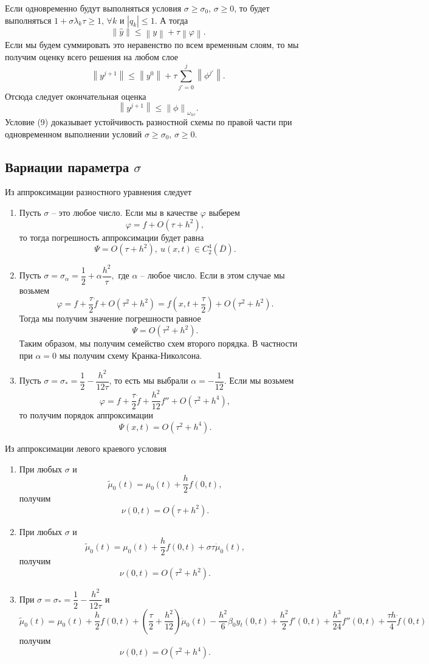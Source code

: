 \documentclass[a4paper, 12pt]{article}
\newcommand\Norm[1]{\left\| #1 \right\|}
\begin{document}
    Если одновременно будут выполняться условия $\sigma \geq \sigma_0$, $\sigma \geq 0$, то будет выполняться $1+\sigma \lambda_k \tau \geq 1$, $\forall k$ и $|q_k|\leq 1$. А тогда 
    $$\Norm {\hat{{ y}}}\leq\Norm{{ y}} + \tau \Norm{\varphi}.$$
    Если мы будем суммировать это неравенство по всем временным слоям, то мы получим оценку всего решения на любом слое 
    $$\Norm{{ {y}}^{j+1}} \leq \Norm{y^0} + \tau \sum_{j'= 0}^j \Norm{\phi^{j'}}.$$
    Отсюда следует окончательная оценка
    \begin{equation}
    	\Norm{{ {y}}^{j+1}}\leq \Norm{\phi}_{\omega _{h\tau}}.
    \end{equation}
    Условие (9) доказывает устойчивость разностной схемы по правой части при одновременном выполнении условий $\sigma \geq \sigma_0$, $\sigma \geq 0$.
    \subsection*{Вариации параметра $\sigma$}
    Из аппроксимации разностного уравнения следует
    \begin{enumerate}
    	\item Пусть $\sigma$ -- это любое число. Если мы в качестве $\varphi$ выберем
    	$$\varphi = f + O(\tau + h^2),$$ то тогда погрешность аппроксимации будет равна
    	$$\Psi = O(\tau + h^2),\ u(x,t) \in C_2^4 (\overline D).$$
    	\item Пусть $\sigma = \sigma_\alpha = \dfrac 12 + \alpha \dfrac{h^2}{\tau},$ где $\alpha$ -- любое число. Если в этом случае мы возьмем
    	$$\varphi = f + \dfrac \tau 2 \dot f + O(\tau^2 + h^2) = f\left(x,t + \dfrac \tau 2\right) + O(\tau^2 + h^2).$$ Тогда мы получим значение погрешности равное
    	$$\Psi = O(\tau^2 + h^2).$$
    	Таким образом, мы получим семейство схем второго порядка. В частности при $\alpha = 0$ мы получим схему Кранка-Николсона.
    	\item Пусть $\sigma = \sigma_* = \dfrac 12 - \dfrac {h^2}{12\tau}$, то есть мы выбрали $\alpha = - \dfrac {1}{12}$. Если мы возьмем
    	$$\varphi = f + \dfrac \tau 2 \dot f + \dfrac{h^2}{12}f'' + O(\tau^2 + h^4),$$
    	то получим порядок аппроксимации
    	$$\Psi(x,t) = O(\tau^2 + h^4).$$
    \end{enumerate}
    Из аппроксимации левого краевого условия
    \begin{enumerate}
    	\item При любых $\sigma$ и
    	$$\tilde \mu_0(t) = \mu_0(t) + \dfrac h2 f(0,t),$$
    	получим $$\nu(0,t) = O(\tau + h^2).$$
    	\item При любых $\sigma$ и
    	$$\tilde \mu_0(t) = \mu_0(t) + \dfrac h2 f(0,t) + \sigma \tau \dot \mu_0(t),$$
    	получим $$\nu(0,t) = O(\tau^2 + h^2).$$
    	\item При $\sigma = \sigma_* = \dfrac 12 - \dfrac{h^2}{12\tau}$ и 
    	$$\tilde \mu_0(t) = \mu_0(t) + \dfrac h2 f(0,t) + \left(\dfrac \tau 2 + \dfrac {h^2}{12}\right)\dot \mu_0(t) - \dfrac{h^2}{6}\beta_0 y_t(0,t) + \dfrac {h^2}{2}f'(0,t) + \dfrac{h^3}{24}f''(0,t) + \dfrac{\tau h}{4}\dot f(0,t)$$
    	получим $$\nu(0,t) = O(\tau^2 + h^4).$$
    \end{enumerate}
\end{document}
